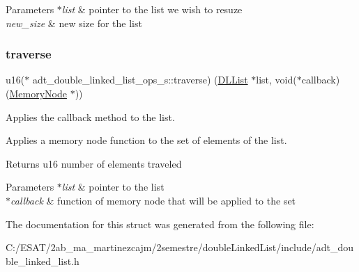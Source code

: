 \begin{DoxyParams}{Parameters}
{\em $\ast$list} & pointer to the list we wish to resuze \\
\hline
{\em new\+\_\+size} & new size for the list \\
\hline
\end{DoxyParams}
\mbox{\label{structadt__double__linked__list__ops__s_ac0751c64cc9556fe18445ae4961ed930}} 
\subsubsection{\texorpdfstring{traverse}{traverse}}
{\footnotesize\ttfamily u16($\ast$ adt\+\_\+double\+\_\+linked\+\_\+list\+\_\+ops\+\_\+s\+::traverse) (\hyperlink{structadt__double__linked__list__s}{D\+L\+List} $\ast$list, void($\ast$callback)(\hyperlink{structmemory__node__s}{Memory\+Node} $\ast$))}



Applies the callback method to the list. 

Applies a memory node function to the set of elements of the list.

\begin{DoxyReturn}{Returns}
u16 number of elements traveled 
\end{DoxyReturn}

\begin{DoxyParams}{Parameters}
{\em $\ast$list} & pointer to the list \\
\hline
{\em $\ast$callback} & function of memory node that will be applied to the set \\
\hline
\end{DoxyParams}


The documentation for this struct was generated from the following file\+:\begin{DoxyCompactItemize}
\item 
C\+:/\+E\+S\+A\+T/2ab\+\_\+ma\+\_\+martinezcajm/2semestre/double\+Linked\+List/include/adt\+\_\+double\+\_\+linked\+\_\+list.\+h\end{DoxyCompactItemize}

